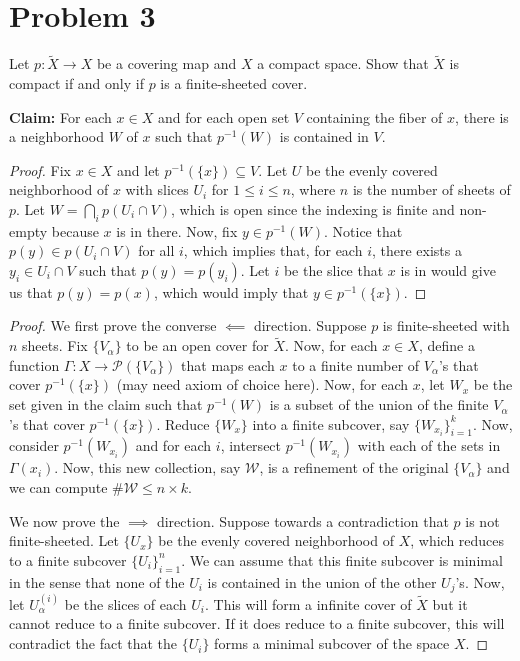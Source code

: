 \documentclass[11pt]{article} %
\newcommand{\wt}{\widetilde}
\begin{document}
\section*{Problem 3}
Let $p:\wt{X}\to X$ be a covering map and $X$ a compact space. Show that $\wt{X}$ is compact if and only if $p$ is a finite-sheeted cover.


\textbf{Claim:} For each $x\in X$ and for each open set $V$ containing the fiber of $x$, there is a neighborhood $W$ of $x$ such that $p^{-1}(W)$ is contained in $V$.


\begin{proof}
Fix $x\in X$ and let $p^{-1}(\{x\})\subseteq V$. Let $U$ be the evenly covered neighborhood of $x$ with slices $U_i$ for $1\leq i\leq n$, where $n$ is the number of sheets of $p$. Let $W = \bigcap_i p(U_i\cap V)$, which is open since the indexing is finite and non-empty because $x$ is in there. Now, fix $y\in p^{-1}(W)$. Notice that $p(y)\in p(U_i\cap V)$ for all $i$, which implies that, for each $i$, there exists a $y_i\in U_i\cap V$ such that $p(y) = p(y_i)$. Let $i$ be the slice that $x$ is in would give us that $p(y) = p(x)$, which would imply that $y\in p^{-1}(\{x\})$.
\end{proof}


\begin{proof}
We first prove the converse $\impliedby$ direction. Suppose $p$ is finite-sheeted with $n$ sheets. Fix $\{V_\alpha\}$ to be an open cover for $\wt{X}$. Now, for each $x\in X$, define a function $\Gamma:X\to \mathcal{P}(\{V_\alpha\})$ that maps each $x$ to a finite number of $V_\alpha$'s that cover $p^{-1}(\{x\})$ (may need axiom of choice here). Now, for each $x$, let $W_x$ be the set given in the claim such that $p^{-1}(W)$ is a subset of the union of the finite $V_\alpha$'s that cover $p^{-1}(\{x\})$. Reduce $\{W_x\}$ into a finite subcover, say $\{W_{x_i}\}_{i=1}^k$. Now, consider $p^{-1}(W_{x_i})$ and for each $i$, intersect $p^{-1}(W_{x_i})$ with each of the sets in $\Gamma(x_i)$. Now, this new collection, say $\mathcal{W}$, is a refinement of the original $\{V_\alpha\}$ and we can compute $\# \mathcal{W}\leq n\times k$.

We now prove the $\implies$ direction. Suppose towards a contradiction that $p$ is not finite-sheeted. Let $\{U_x\}$ be the evenly covered neighborhood of $X$, which reduces to a finite subcover $\{U_i\}_{i=1}^n$. We can assume that this finite subcover is minimal in the sense that none of the $U_i$ is contained in the union of the other $U_j$'s. Now, let $U_\alpha^{(i)}$ be the slices of each $U_i$. This will form a infinite cover of $\wt{X}$ but it cannot reduce to a finite subcover. If it does reduce to a finite subcover, this will contradict the fact that the $\{U_i\}$ forms a minimal subcover of the space $X$.
\end{proof}
\end{document}
